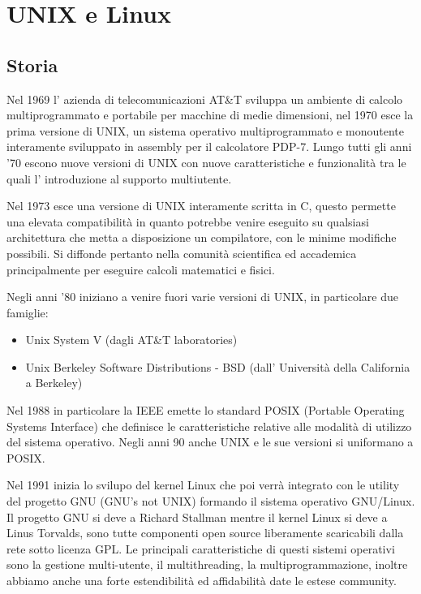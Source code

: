 \section{UNIX e Linux}
\subsection{Storia}
Nel 1969 l' azienda di telecomunicazioni AT\&T sviluppa un ambiente di calcolo multiprogrammato e portabile per macchine di medie dimensioni, nel 1970 esce la prima versione di UNIX, un sistema operativo multiprogrammato e monoutente interamente sviluppato in assembly per il calcolatore PDP-7.
Lungo tutti gli anni '70 escono nuove versioni di UNIX con nuove caratteristiche e funzionalità tra le quali l' introduzione al supporto multiutente.

Nel 1973 esce una versione di UNIX interamente scritta in C, questo permette una elevata compatibilità in quanto potrebbe venire eseguito su qualsiasi architettura che metta a disposizione un compilatore, con le minime modifiche possibili.
Si diffonde pertanto nella comunità scientifica ed accademica principalmente per eseguire calcoli matematici e fisici.

Negli anni '80 iniziano a venire fuori varie versioni di UNIX, in particolare due famiglie:
\begin{itemize}
    \item Unix System V (dagli AT\&T laboratories)
    \item Unix Berkeley Software Distributions - BSD (dall' Università della California a Berkeley)
\end{itemize}
Nel 1988 in particolare la IEEE emette lo standard POSIX (Portable Operating Systems Interface) che definisce le caratteristiche relative alle modalità di utilizzo del sistema operativo.
Negli anni 90 anche UNIX e le sue versioni si uniformano a POSIX.

Nel 1991 inizia lo svilupo del kernel Linux che poi verrà integrato con le utility del progetto GNU (GNU's not UNIX) formando il sistema operativo GNU/Linux.
Il progetto GNU si deve a Richard Stallman mentre il kernel Linux si deve a Linus Torvalds, sono tutte componenti open source liberamente scaricabili dalla rete sotto licenza GPL.
Le principali caratteristiche di questi sistemi operativi sono la gestione multi-utente, il multithreading, la multiprogrammazione, inoltre abbiamo anche una forte estendibilità ed affidabilità date le estese community.

